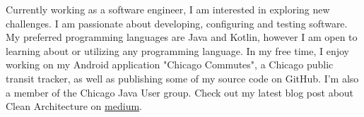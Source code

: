 
\begin{cvsynopsis}

\cvparagraph
Currently working as a software engineer, I am interested in exploring new challenges. I am passionate about developing, configuring and testing software. My preferred programming languages are Java and Kotlin, however I am open to learning about or utilizing any programming language. In my free time, I enjoy working on my Android application "Chicago Commutes", a Chicago public transit tracker, as well as publishing some of my source code on GitHub. I'm also a member of the Chicago Java User group. Check out my latest blog post about Clean Architecture on \href{https://medium.com/slalom-engineering/clean-architecture-with-java-11-f78bba431041}{medium}.


\end{cvsynopsis}
